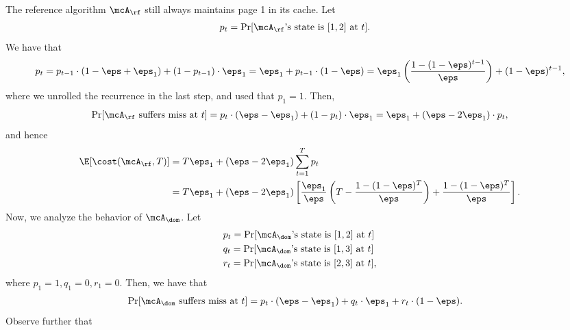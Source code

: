 The reference algorithm $\mcA_\rf$ still always maintains page 1 in its cache. Let
\begin{align*}
    p_t &= \Pr[\text{$\mcA_\rf$'s state is $[1,2]$ at $t$}].
\end{align*}
We have that
\begin{align*}
    p_t = p_{t-1} \cdot (1-\eps+\eps_1) + (1-p_{t-1}) \cdot \eps_1 
    = \eps_1 + p_{t-1} \cdot (1-\eps) 
    = \eps_1 \left(\frac{1-(1-\eps)^{t-1}}{\eps}\right) + (1-\eps)^{t-1},
\end{align*}
where we unrolled the recurrence in the last step, and used that $p_1=1$. Then,
\begin{align*}
    \Pr[\mcA_\rf \text{ suffers miss at }t] = p_t \cdot (\eps-\eps_1) + (1-p_t) \cdot \eps_1
    = \eps_1 + (\eps-2\eps_1)\cdot p_t,
\end{align*}
and hence
\begin{align}
    \E[\cost(\mcA_\rf, T)] &= T\eps_1 + (\eps-2\eps_1) \sum_{t=1}^T p_t \nonumber \\
    &= T\eps_1 + (\eps-2\eps_1)\left[ \frac{\eps_1}{\eps}\left( T - \frac{1-(1-\eps)^T}{\eps} \right) + \frac{1-(1-\eps)^T}{\eps} \right]. \label{eqn:ref-gen-misses}
\end{align}
Now, we analyze the behavior of $\mcA_\dom$. Let
\begin{align*}
    &p_t = \Pr[\text{$\mcA_\dom$'s state is $[1,2]$ at $t$}] \\
    &q_t = \Pr[\text{$\mcA_\dom$'s state is $[1,3]$ at $t$}] \\
    &r_t = \Pr[\text{$\mcA_\dom$'s state is $[2,3]$ at $t$}],
\end{align*}
where $p_1=1, q_1=0, r_1=0$. Then, we have that
\begin{align}
    \label{eqn:miss-eqn}
    \Pr[\mcA_\dom \text{ suffers miss at }t] &= p_t \cdot (\eps-\eps_1) + q_t \cdot \eps_1 + r_t \cdot (1-\eps).
\end{align}
 Observe further that
